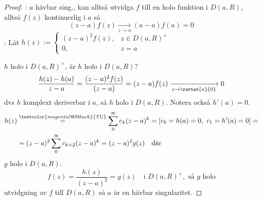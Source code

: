 \begin{proof}
\fbox{$\Rightarrow$}: $a$ hävbar sing., kan alltså utvidga $f$ till en holo funktion i $D(a, R)$, alltså $f(z)$ kontinuerlig i $a$ så
\[ (z - a)f(z) \xrightarrow[z \to a]{} (a - a)f(a) = 0 \]
\fbox{$\Leftarrow$}: Låt $h(z) := \begin{cases} (z - a)^2 f(z), & z \in D(a, R)^\times \\ 0, & z = a \end{cases}$

$h$ holo i $D(a, R)^\times$, är $h$ holo i $D(a, R)$?
\[ \frac{h(z) - h(a)}{z - a} = \frac{(z - a)^2 f(z)}{(z - a)} = (z - a)f(z) \xrightarrow[z \to \rattat{a}{0}]{} 0 \]
dvs $h$ komplext deriverbar i $a$, så $h$ holo i $D(a, R)$. Notera också $h'(a) = 0$.
\begin{align*}
h(z) &\overset{\textcolor{magenta!80!black}{\text{TU}}}{=} \sum_0^\infty c_k(z - a)^k = \left[ c_0 = h(a) = 0,\ c_1 = h'(a) = 0 \right] = \\
&= (z - a)^2\sum_0^\infty c_{k + 2}(z - a)^k = (z - a)^2 g(z) \quad \text{där}
\end{align*}
$g$ holo i $D(a, R)$.
\[ f(z) = \frac{h(z)}{(z - a)^2} = g(z) \quad \text{i } D(a, R)^\times, \text{ så } g \text{ holo} \]
utvidgning av $f$ till $D(a, R)$ så $a$ är en hävbar singularitet.
\end{proof}
